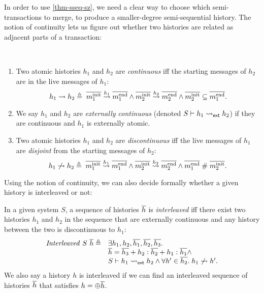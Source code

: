 \documentclass[sigplan,10pt,review,anonymous,screen]{acmart}\settopmatter{printfolios=true,printccs=false,printacmref=false}
\begin{document}
In order to use \autoref{thm-sseq-sz}, we need a clear way to choose which semi-transactions to merge, to produce a smaller-degree semi-sequential history.
The notion of continuity lets us figure out whether two histories are related as adjacent parts of a transaction:
\begin{definition}[Continuity]\mbox{}\\
  \begin{enumerate}
  \item Two atomic histories $h_1$ and $h_2$ are \emph{continuous} iff the
    starting messages of $h_2$ are in the live messages of $h_1$:
    \begin{displaymath}
      h_1 \leadsto h_2 \triangleq\; \overline{m_1^{\textrm{init}}} \stackrel{h_1}{\rightsquigarrow} \overline{m_1^{\textrm{end}}} \wedge \overline{m_2^{\textrm{init}}} \stackrel{h_2}{\rightsquigarrow} \overline{m_2^{\textrm{end}}} \wedge \overline{m_2^{\textrm{init}}} \subseteq \overline{m_1^{\textrm{end}}}.
    \end{displaymath}
  \item We say $h_1$ and $h_2$ are \emph{externally continuous} (denoted
    $S \vdash h_1 \leadsto_{\textsf{ext}} h_2$) if they are continuous and $h_1$ is externally
    atomic.
  \item Two atomic histories $h_1$ and $h_2$ are \emph{discontinuous} iff the live messages of
    $h_1$ are \emph{disjoint} from the starting messages of $h_2$:
    \begin{displaymath}
      h_1 \not\leadsto h_2 \triangleq\; \overline{m_1^{\textrm{init}}} \stackrel{h_1}{\rightsquigarrow} \overline{m_1^{\textrm{end}}} \wedge \overline{m_2^{\textrm{init}}} \stackrel{h_2}{\rightsquigarrow} \overline{m_2^{\textrm{end}}} \wedge \overline{m_1^{\textrm{end}}} \; \# \; \overline{m_2^{\textrm{init}}}.
    \end{displaymath}
  \end{enumerate}
\end{definition}

Using the notion of continuity, we can also decide formally whether a given history is interleaved or not:
\begin{definition}
  In a given system $S$, a sequence of histories $\overline{h}$ is \emph{interleaved} iff there exist two histories $h_1$ and $h_2$ in the sequence that are externally continuous and any history between the two is discontinuous to $h_1$:
  \begin{displaymath}
    \begin{array}{rl}
      \mathit{Interleaved}\ S\ \overline{h} \triangleq & \exists h_1, h_2, \overline{h_1}, \overline{h_2}, \overline{h_3}. \\
      & \overline{h} = \overline{h_3} + h_2 : \overline{h_2} + h_1 : \overline{h_1} \wedge \\
      & S \vdash h_1 \leadsto_{\textsf{ext}} h_2 \wedge \forall h' \in \overline{h_2}.\; h_1 \not\leadsto h'.
    \end{array}
  \end{displaymath}
  We also say a history $h$ is interleaved if we can find an interleaved sequence of histories $\overline{h}$ that satisfies $h = \oplus \overline{h}$.
\end{definition}
\end{document}
